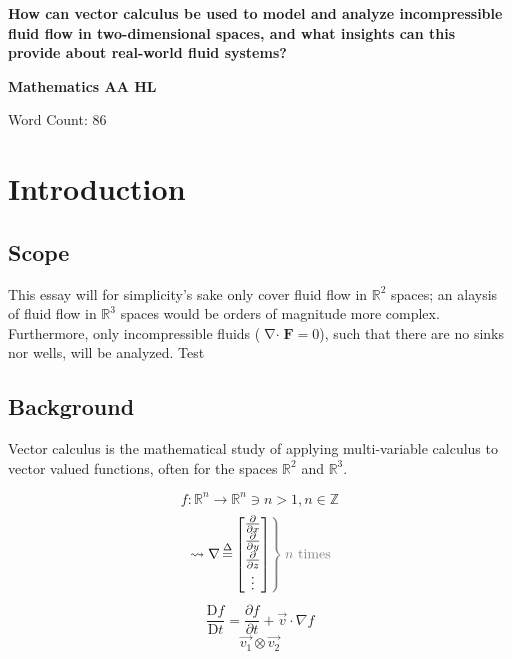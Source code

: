 \documentclass[a4paper, 12pt]{article} %
\newcommand{\fatf}{\mathbf{F}} %
\DeclareMathOperator{\definedas}{\stackrel{\Delta}{=}} %
\newcommand{\partialder}[2]{\frac{\partial #1}{\partial #2}}
\newcommand{\materialder}[2]{\frac{\mathrm{D} #1}{\mathrm{D} #2}}
\DeclareMathOperator{\divergence}{\nabla\cdot} %
\begin{document}
\begin{titlepage} %
	\begin{center}
		\vspace*{0.5cm}
		\Large
		\textbf{How can vector calculus be used to model and analyze incompressible fluid flow in two-dimensional spaces, and what insights can this provide about real-world fluid systems?}

		\vspace{1.5cm}
		\large
		\textbf{Mathematics AA HL}

		\vspace{9cm}\color{darkgray}
		Word Count: 86 %
	\end{center}
\end{titlepage}

\tableofcontents\newpage %

\section{Introduction}
\subsection{Scope}
This essay will for simplicity's sake only cover fluid flow in $\mathbb{R}^2$ spaces; an alaysis of fluid flow in $\mathbb{R}^3$ spaces would be orders of magnitude more complex.
Furthermore, only incompressible fluids ($\divergence\fatf=0$), such that there are no sinks nor wells, will be analyzed. Test

\subsection{Background}
Vector calculus is the mathematical study of applying multi-variable calculus to vector valued functions, often for the spaces $\mathbb{R}^2$ and $\mathbb{R}^3$.

$$f:\mathbb{R}^n\rightarrow\mathbb{R}^n\ni n>1,n\in\mathbb{Z}$$
\begin{equation}
	\left.\leadsto\nabla\definedas
	\left[\begin{matrix}
		\frac{\partial}{\partial x} \\
		\frac{\partial}{\partial y} \\
		\frac{\partial}{\partial z} \\
		\vdots 					    \\
	\end{matrix}\right]
	\color{gray}\right\} \color{gray}n\text{ times}\color{black}
\end{equation}
\begin{equation}
	\materialder{f}{t}=\partialder{f}{t}+\vec{v}\cdot\nabla f
\end{equation}
$$\vec{v_1}\otimes\vec{v_2}$$
\end{document}
